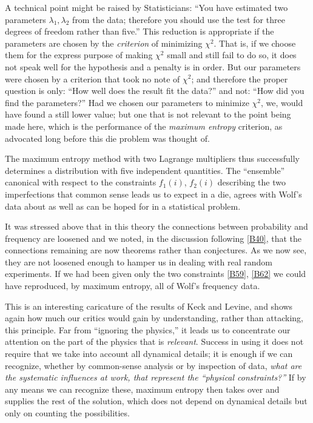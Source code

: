 {A technical point might be raised by Statisticians: ``You have estimated two parameters $\lambda_1, \lambda_2$ from the data; therefore you should use the test for three degrees of freedom rather than five.''
This reduction is appropriate if the parameters are chosen by the \emph{criterion} of minimizing $\chi^2$.
That is, if we choose them for the express purpose of making $\chi^2$ small and still fail to do so, it does not speak well for the hypothesis and a penalty is in order.
But our parameters were chosen by a criterion that took no note of $\chi^2$; and therefore the proper question is only: ``How well does the result fit the data?'' and not: ``How did you find the parameters?''
Had we chosen our parameters to minimize $\chi^2$, we, would have found a still lower value; but one that is not relevant to the point being made here, which is the performance of the \emph{maximum entropy} criterion, as advocated long before this die problem was thought of.

The maximum entropy method with two Lagrange multipliers thus successfully determines a distribution with five independent quantities.
The ``ensemble'' canonical with respect to the constraints $f_1(i)$, $f_2(i)$ describing the two imperfections that common sense leads us to expect in a die, agrees with Wolf's data about as well as can be hoped for in a statistical problem.

It was stressed above that in this theory the connections between probability and frequency are loosened and we noted, in the discussion following \eqref{B40}, that the connections remaining are now theorems rather than conjectures.
As we now see, they are not loosened enough to hamper us in dealing with real random experiments.
If we had been given only the two constraints \eqref{B59}, \eqref{B62} we could have reproduced, by maximum entropy, all of Wolf's frequency data.

This is an interesting caricature of the results of Keck and Levine, and shows again how much our critics would gain by understanding, rather than attacking, this principle.
Far from ``ignoring the physics,'' it leads us to concentrate our attention on the part of the physics that is \emph{relevant}.
Success in using it does not require that we take into account all dynamical details; it is enough if we can recognize, whether by common-sense analysis or by inspection of data, \emph{what are the systematic influences at work, that represent the ``physical constraints?''}
If by any means we can recognize these, maximum entropy then takes over and supplies the rest of the solution, which does not depend on dynamical details but only on counting the possibilities.

}
